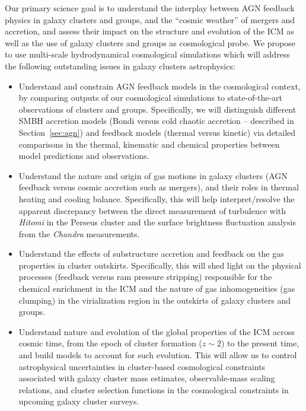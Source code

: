 \documentclass[letterpaper,11pt]{article}
\begin{document}
Our primary science goal is to understand the interplay between AGN feedback physics in galaxy clusters and groups, and the ``cosmic weather'' of mergers and accretion, and assess their impact on the structure and evolution of the ICM as well as the use of galaxy clusters and groups as cosmological probe. We propose to use multi-scale hydrodynamical cosmological simulations which will address the following outstanding issues in galaxy clusters astrophysics: 

\begin{itemize}

\item Understand and constrain AGN feedback models in the cosmological context, by comparing outputs of our cosmological simulations to state-of-the-art observations of clusters and groups. Specifically, we will distinguish different SMBH accretion models (Bondi versus cold chaotic accretion -- described in Section~\ref{sec:agn}) and feedback models (thermal versus kinetic) via detailed comparisons in the thermal, kinematic and chemical properties between model predictions and observations. 

\item Understand the nature and origin of gas motions in galaxy clusters (AGN feedback versus cosmic accretion such as mergers), and their roles in thermal heating and cooling balance.  
Specifically, this will help interpret/resolve the apparent discrepancy between the direct measurement of turbulence with {\em Hitomi} in the Perseus cluster and the surface brightness fluctuation analysis from the {\em Chandra} measurements. 

\item Understand the effects of substructure accretion and feedback on the gas properties in cluster outskirts. Specifically, this will shed light on the physical processes (feedback versus ram pressure stripping) responsible for the chemical enrichment in the ICM and the nature of gas inhomogeneities (gas clumping) in the virialization region in the outskirts of galaxy clusters and groups. 

\item Understand nature and evolution of the global properties of the ICM across cosmic time, from the epoch of cluster formation ($z \sim 2$) to the present time, and build models to account for such evolution. This will allow us to control astrophysical uncertainties in cluster-based cosmological constraints associated with galaxy cluster mass estimates, observable-mass scaling relations, and cluster selection functions in the cosmological constraints in upcoming galaxy cluster surveys. 

\end{itemize}
\end{document}
